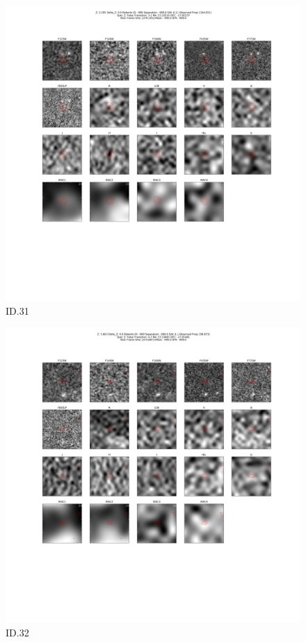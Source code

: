 \begin{figure}[tbp]
\centering \includegraphics[width=120mm]{Matched/ASPECS_Cutout_31.png}
\caption{ID.31}
\label{fig:Match_Three}
\end{figure}

\begin{figure}[tbp]
\centering \includegraphics[width=120mm]{Matched/ASPECS_Cutout_32.png}
\caption{ID.32}
\label{fig:Match_Three}
\end{figure}

